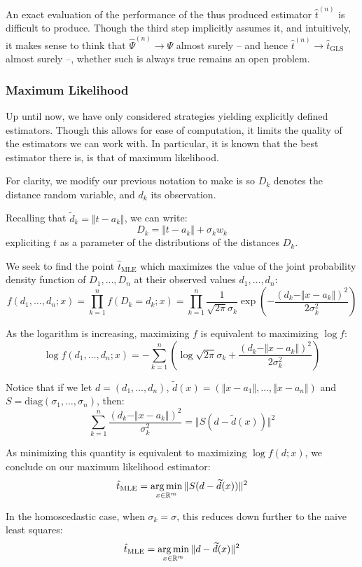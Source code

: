 An exact evaluation of the performance of the thus produced estimator $\hat t^{(n)}$ is difficult to produce. Though the third step implicitly assumes it, and intuitively, it makes sense to think that $\hat\Psi^{(n)}\to\Psi$ almost surely -- and hence $\hat t^{(n)}\to\hat t_\text{GLS}$ almost surely --, whether such is always true remains an open problem.

\subsubsection{Maximum Likelihood}
Up until now, we have only considered strategies yielding explicitly defined estimators. Though this allows for ease of computation, it limits the quality of the estimators we can work with. In particular, it is known that the best estimator there is, is that of maximum likelihood.

For clarity, we modify our previous notation to make is so $D_k$ denotes the distance random variable, and $d_k$ its observation.

Recalling that $\widetilde d_k = \Vert t-a_k\Vert$, we can write:
\[
    D_k = \Vert t-a_k\Vert + \sigma_k w_k
\]
expliciting $t$ as a parameter of the distributions of the distances $D_k$.

We seek to find the point $\hat t_\text{MLE}$ which maximizes the value of the joint probability density function of $D_1, \dots, D_n$ at their observed values $d_1, \dots, d_n$:
\[
    f(d_1, \dots, d_n; x) = \prod_{k=1}^n f(D_k=d_k;x) = \prod_{k=1}^n \frac{1}{\sqrt{2\pi}\sigma_k}\exp{\left(-\frac{(d_k-\Vert x-a_k\Vert)^2}{2\sigma_k^2}\right)}
\]

As the logarithm is increasing, maximizing $f$ is equivalent to maximizing $\log f$:
\[
    \log f(d_1, \dots, d_n;x) = -\sum_{k=1}^{n} \left(\log{\sqrt{2\pi}\sigma_k} + \frac{(d_k-\Vert x-a_k\Vert)^2}{2\sigma_k^2}\right)
\]

Notice that if we let $d = (d_1, \dots, d_n)$, $\widetilde d(x)=(\Vert x-a_1\Vert, \dots, \Vert x-a_n\Vert)$ and $S=\mathrm{diag}(\sigma_1,\dots,\sigma_n)$, then:
\[
    \sum_{k=1}^n \frac{(d_k-\Vert x-a_k\Vert)^2}{\sigma_k^2} = \Vert S(d-\widetilde d(x))\Vert^2
\]

As minimizing this quantity is equivalent to maximizing $\log f(d;x)$, we conclude on our maximum likelihood estimator:
\[
    \hat t_\text{MLE} = \operatorname*{arg\,min}_{x\in\mathbb R^m} \Vert S(d-\widetilde d(x)) \Vert^2
\]

In the homoscedastic case, when $\sigma_k=\sigma$, this reduces down further to the naive least squares:
\[
    \hat t_\text{MLE} = \operatorname*{arg\,min}_{x\in\mathbb R^m} \Vert d-\widetilde d(x)\Vert^2
\]

